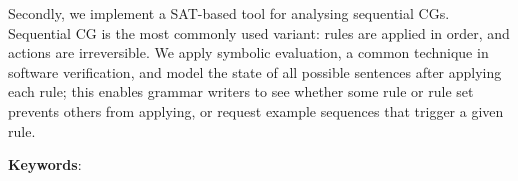 Secondly, we implement a SAT-based tool for analysing sequential CGs.
Sequential CG is the most commonly used variant: rules are applied in order, 
and actions are irreversible.
We apply symbolic evaluation, a common technique in software verification, 
and model the state of all possible sentences after applying each rule;
this enables grammar writers to see whether some rule or rule set prevents
others from applying, or request example sequences that trigger a given rule.

\bigskip
\noindent
\textbf{Keywords}: \emph{\lickeywords}
